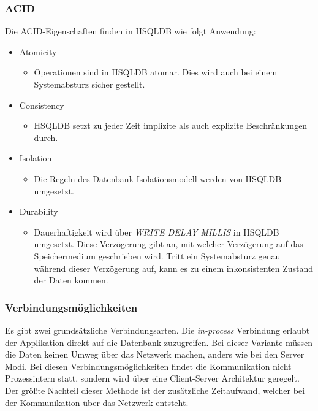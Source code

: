 \documentclass[draft,final]{vutinfth} %
\begin{document}
\subsubsection*{ACID}
Die ACID-Eigenschaften finden in HSQLDB wie folgt Anwendung:
\begin{itemize}
	\item Atomicity
	\begin{itemize}
		\item Operationen sind in HSQLDB atomar. Dies wird auch bei einem Systemabsturz sicher gestellt.
	\end{itemize}
	\item Consistency
	\begin{itemize}
		\item HSQLDB setzt zu jeder Zeit implizite als auch explizite Beschränkungen durch.
	\end{itemize}
	\item Isolation
	\begin{itemize}
		\item Die Regeln des Datenbank Isolationsmodell werden von HSQLDB umgesetzt.
	\end{itemize}
	\item Durability
	\begin{itemize}
		\item Dauerhaftigkeit wird über \textit{WRITE DELAY MILLIS} in HSQLDB umgesetzt. Diese Verzögerung gibt an, mit welcher Verzögerung auf das Speichermedium geschrieben wird. Tritt ein Systemabsturz genau während dieser Verzögerung auf, kann es zu einem inkonsistenten Zustand der Daten kommen.
	\end{itemize}
\end{itemize}

\subsubsection*{Verbindungsmöglichkeiten}

Es gibt zwei grundsätzliche Verbindungsarten. Die \textit{in-process} Verbindung erlaubt der Applikation direkt auf die Datenbank zuzugreifen. Bei dieser Variante müssen die Daten keinen Umweg über das Netzwerk machen, anders wie bei den Server Modi. Bei diesen Verbindungsmöglichkeiten findet die Kommunikation nicht Prozessintern statt, sondern wird über eine Client-Server Architektur geregelt. Der grö\ss te Nachteil dieser Methode ist der zusätzliche Zeitaufwand, welcher bei der Kommunikation über das Netzwerk entsteht. 
\end{document}
